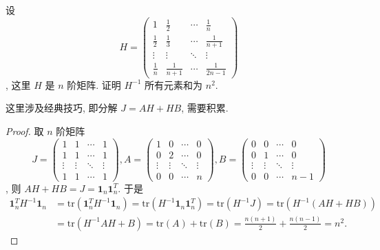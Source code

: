 \documentclass[../../main.tex]{subfiles}
\begin{document}
\begin{lemma}[Hilbert矩阵逆矩阵元素和]\label{lemma:Hilbert矩阵逆矩阵元素和}
设
\[
H = 
\begin{pmatrix}
1 & \frac{1}{2} & \cdots & \frac{1}{n} \\
\frac{1}{2} & \frac{1}{3} & \cdots & \frac{1}{n + 1} \\
\vdots & \vdots & \ddots & \vdots \\
\frac{1}{n} & \frac{1}{n + 1} & \cdots & \frac{1}{2n - 1}
\end{pmatrix}
\]
, 这里 $H$ 是 $n$ 阶矩阵. 证明 $H^{-1}$ 所有元素和为 $n^{2}$.
\end{lemma}
\begin{note}
这里涉及经典技巧, 即分解 $J = AH + HB$, 需要积累.
\end{note}
\begin{proof}
取 $n$ 阶矩阵
\[
J = 
\begin{pmatrix}
1 & 1 & \cdots & 1 \\
1 & 1 & \cdots & 1 \\
\vdots & \vdots & \ddots & \vdots \\
1 & 1 & \cdots & 1
\end{pmatrix}
,
A = 
\begin{pmatrix}
1 & 0 & \cdots & 0 \\
0 & 2 & \cdots & 0 \\
\vdots & \vdots & \ddots & \vdots \\
0 & 0 & \cdots & n
\end{pmatrix}
,
B = 
\begin{pmatrix}
0 & 0 & \cdots & 0 \\
0 & 1 & \cdots & 0 \\
\vdots & \vdots & \ddots & \vdots \\
0 & 0 & \cdots & n - 1
\end{pmatrix}
\]
,
则 $AH + HB = J = \mathbf{1}_{n}\mathbf{1}_{n}^{T}$. 于是
\begin{align*}
\mathbf{1}_{n}^{T}H^{-1}\mathbf{1}_{n} &= \mathrm{tr}\left(\mathbf{1}_{n}^{T}H^{-1}\mathbf{1}_{n}\right) = \mathrm{tr}\left(H^{-1}\mathbf{1}_{n}\mathbf{1}_{n}^{T}\right) = \mathrm{tr}\left(H^{-1}J\right) = \mathrm{tr}\left(H^{-1}(AH + HB)\right) \\
&= \mathrm{tr}\left(H^{-1}AH + B\right) = \mathrm{tr}(A) + \mathrm{tr}(B) = \frac{n(n + 1)}{2} + \frac{n(n - 1)}{2} = n^{2}.
\end{align*} 
\end{proof}
\end{document}
